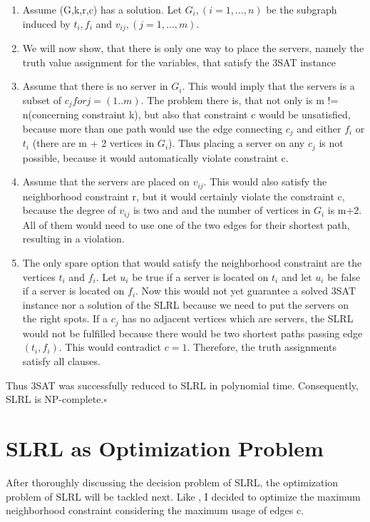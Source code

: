 \documentclass [12pt]{article}
\begin{document}
\begin{enumerate}
  \item{Assume (G,k,r,c) has a solution. Let $G_i, (i=1,\dots,n)$ be the subgraph induced
    by $t_i, f_i$ and $v_{ij},(j=1,\dots,m)$.}
  \item{We will now show, that there is only one way to place the servers, namely the truth
    value assignment for the variables, that satisfy the 3SAT instance}
  \item{Assume that there is no server in $G_i$. This would imply that the servers is a subset of
      $c_j for j=(1..m)$. The problem there is, that not only is m != n(concerning constraint k),
      but also that constraint c would be unsatisfied, because more than one path would use 
      the edge connecting $c_j$ and either $f_i$ or $t_i$ (there are m + 2 vertices in $G_i$).
    Thus placing a server on any $c_j$ is not possible, because it would automatically violate constraint c.}
  \item{Assume that the servers are placed on $v_{ij}$. This would also satisfy the neighborhood 
      constraint r, but it would certainly violate the constraint c, because the degree of $v_{ij}$ is two and
      and the number of vertices in $G_i$ is m+2. All of them would need to use one of the two edges for their shortest path,
    resulting in a violation.}
  \item{The only spare option that would satisfy the neighborhood constraint 
      are the vertices $t_i$ and $f_i$. Let $u_i$ be true if a server is located on
      $t_i$ and let $u_i$ be false if a server is located on $f_i$. Now this would not yet 
      guarantee a solved 3SAT instance nor a solution of the SLRL because we need to put
      the servers on the right spots. If a $c_j$ has no adjacent vertices which are servers,
      the SLRL would not be fulfilled because there would be two shortest paths passing edge
      $(t_i,f_i)$. This would contradict $c = 1$. Therefore, the truth assignments satisfy all
    clauses.}
\end{enumerate}
Thus 3SAT was successfully reduced to SLRL in polynomial time.
Consequently, SLRL is NP-complete.$\square$

\section{SLRL as Optimization Problem}

After thoroughly discussing the decision problem of SLRL, the optimization problem
of SLRL will be tackled next. Like \cite{mirrorserver}, I decided to optimize the maximum 
neighborhood constraint considering the maximum usage of edges c.
\end{document}
